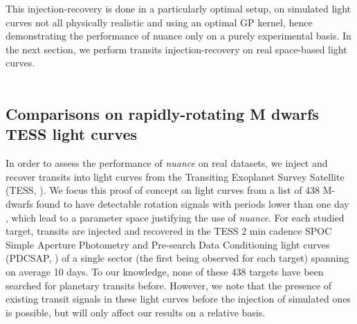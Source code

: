 \documentclass[modern]{aastex631}
\newcommand{\nuancemethod}{\textit{nuance}}
\newcommand{\nuance}{\nuancemethod{}}
\begin{document}
\noindent This injection-recovery is done in a particularly optimal setup, on simulated light curves not all physically realistic and using an optimal GP kernel, hence demonstrating the performance of \textsf{nuance} only on a purely experimental basis. In the next section, we perform transits injection-recovery on real space-based light curves.\\\\
\subsection{Comparisons on rapidly-rotating M dwarfs TESS light curves}\label{real}



In order to assess the performance of \nuance{} on real datasets, we inject and recover transits into light curves from the Transiting Exoplanet Survey Satellite (TESS, \citealt{tess}). We focus this proof of concept on light curves from a list of 438 M-dwarfs found to have detectable rotation signals with periods lower than one day \citep{Ramsay2020}, which lead to a parameter space justifying the use of \nuance{}. For each studied target, transits are injected and recovered in the TESS 2 min cadence SPOC Simple Aperture Photometry and Pre-search Data Conditioning light curves (PDCSAP, \citealt{spoc}) of a single sector (the first being observed for each target) spanning on average 10 days. To our knowledge, none of these 438 targets have been searched for planetary transits before. However, we note that the presence of existing transit signals in these light curves before the injection of simulated ones is possible, but will only affect our results on a relative basis.\\\\
\end{document}
